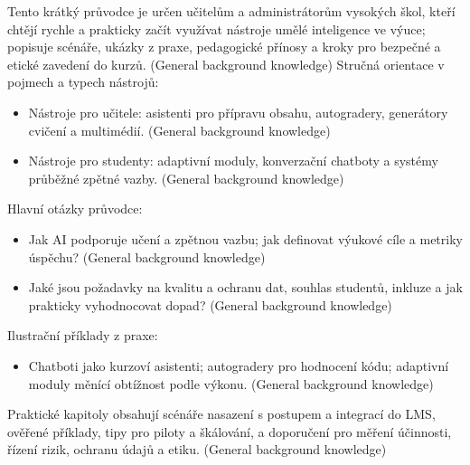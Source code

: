 Tento krátký průvodce je určen učitelům a administrátorům vysokých škol, kteří chtějí rychle a prakticky začít využívat nástroje umělé inteligence ve výuce; popisuje scénáře, ukázky z praxe, pedagogické přínosy a kroky pro bezpečné a etické zavedení do kurzů. (General background knowledge)
Stručná orientace v pojmech a typech nástrojů:
\begin{itemize}
  \item Nástroje pro učitele: asistenti pro přípravu obsahu, autogradery, generátory cvičení a multimédií. (General background knowledge)
  \item Nástroje pro studenty: adaptivní moduly, konverzační chatboty a systémy průběžné zpětné vazby. (General background knowledge)
\end{itemize}
Hlavní otázky průvodce:
\begin{itemize}
  \item Jak AI podporuje učení a zpětnou vazbu; jak definovat výukové cíle a metriky úspěchu? (General background knowledge)
  \item Jaké jsou požadavky na kvalitu a ochranu dat, souhlas studentů, inkluze a jak prakticky vyhodnocovat dopad? (General background knowledge)
\end{itemize}
Ilustrační příklady z praxe:
\begin{itemize}
  \item Chatboti jako kurzoví asistenti; autogradery pro hodnocení kódu; adaptivní moduly měnící obtížnost podle výkonu. (General background knowledge)
\end{itemize}
Praktické kapitoly obsahují scénáře nasazení s postupem a integrací do LMS, ověřené příklady, tipy pro piloty a škálování, a doporučení pro měření účinnosti, řízení rizik, ochranu údajů a etiku. (General background knowledge)